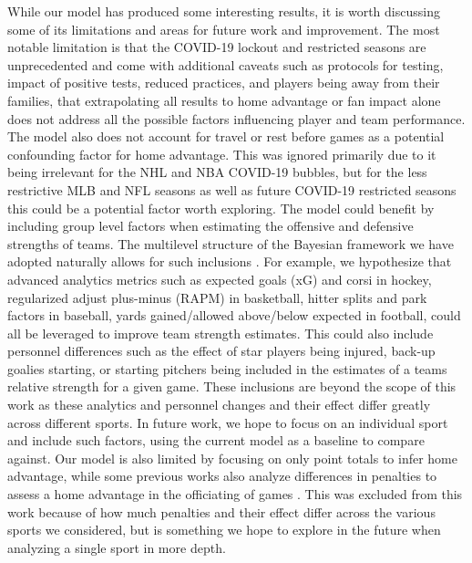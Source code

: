 While our model has produced some interesting results, it is worth discussing some of its limitations and areas for future work and improvement. The most notable limitation is that the COVID-19 lockout and restricted seasons are unprecedented and come with additional caveats such as protocols for testing, impact of positive tests, reduced practices, and players being away from their families, that extrapolating all results to home advantage or fan impact alone does not address all the possible factors influencing player and team performance. The model also does not account for travel or rest before games as a potential confounding factor for home advantage. This was ignored primarily due to it being irrelevant for the NHL and NBA COVID-19 bubbles, but for the less restrictive MLB and NFL seasons as well as future COVID-19 restricted seasons this could be a potential factor worth exploring. The model could benefit by including group level factors when estimating the offensive and defensive strengths of teams. The multilevel structure of the Bayesian framework we have adopted naturally allows for such inclusions \cite{Gelman2006} \cite{Gelman2014} \cite{McElreath2020}. For example, we hypothesize that advanced analytics metrics such as expected goals (xG) and corsi in hockey, regularized adjust plus-minus (RAPM) in basketball, hitter splits and park factors in baseball, yards gained/allowed above/below expected in football, could all be leveraged to improve team strength estimates. This could also include personnel differences such as the effect of star players being injured, back-up goalies starting, or starting pitchers being included in the estimates of a teams relative strength for a given game. These inclusions are beyond the scope of this work as these analytics and personnel changes and their effect differ greatly across different sports. In future work, we hope to focus on an individual sport and include such factors, using the current model as a baseline to compare against. Our model is also limited by focusing on only point totals to infer home advantage, while some previous works also analyze differences in penalties to assess a home advantage in the officiating of games \cite{Benz2020} \cite{Unkelbach2010} \cite{Buraimo2010} \cite{Dohmen2016}. This was excluded from this work because of how much penalties and their effect differ across the various sports we considered, but is something we hope to explore in the future when analyzing a single sport in more depth.
